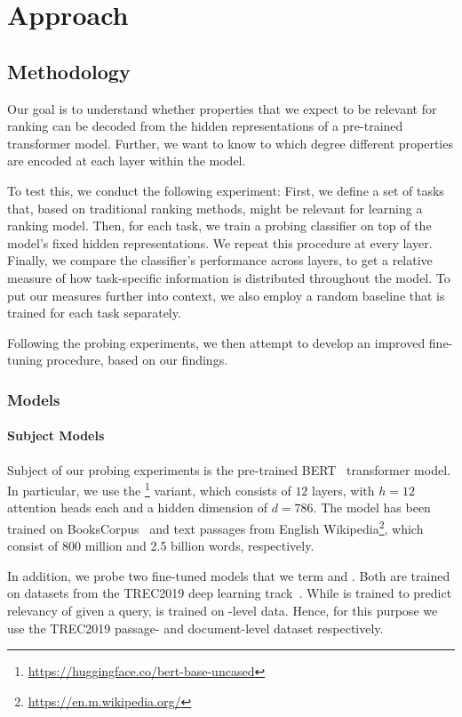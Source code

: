 \chapter{Approach}
\label{chap:approach}

\section{Methodology}
Our goal is to understand whether properties that we expect to be relevant for ranking can be decoded from the hidden representations of a pre-trained transformer model. Further, we want to know to which degree different properties are encoded at each layer within the model.

To test this, we conduct the following experiment: First, we define a set of tasks that, based on traditional ranking methods, might be relevant for learning a ranking model. Then, for each task, we train a probing classifier on top of the model's fixed hidden representations. We repeat this procedure at every layer. Finally, we compare the classifier's performance across layers, to get a relative measure of how task-specific information is distributed throughout the model. To put our measures further into context, we also employ a random baseline that is trained for each task separately.

Following the probing experiments, we then attempt to develop an improved fine-tuning procedure, based on our findings.

\subsection{Models}
\subsubsection{Subject Models}
Subject of our probing experiments is the pre-trained BERT~\cite{devlin-etal-2019-bert} transformer model. In particular, we use the \footnote{\url{https://huggingface.co/bert-base-uncased}} variant, which consists of $12$ layers, with $h=12$ attention heads each and a hidden dimension of $d=786$. The model has been trained on BooksCorpus~\cite{7410368} and text passages from English Wikipedia\footnote{\url{https://en.m.wikipedia.org/}}, which consist of 800 million and 2.5 billion words, respectively.

In addition, we probe two fine-tuned  models that we term  and . Both are trained on datasets from the TREC2019 deep learning track~\cite{DBLP:journals/corr/abs-2003-07820}. While  is trained to predict relevancy of  given a query,  is trained on -level data. Hence, for this purpose we use the TREC2019 passage- and document-level dataset respectively.

